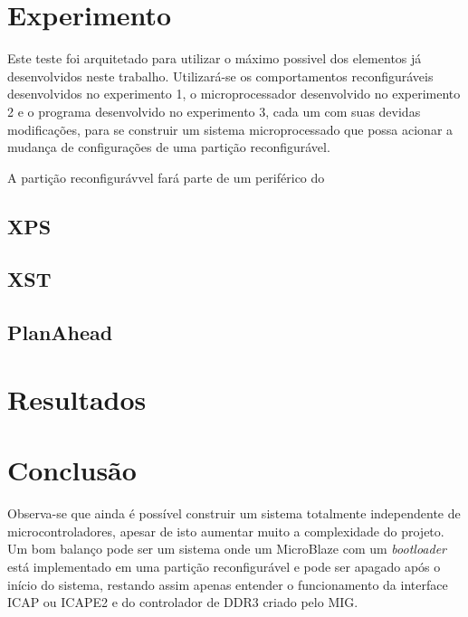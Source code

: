 \documentclass[11pt,a4paper,oneside]{book}
\begin{document}
\section{Experimento}
Este teste foi arquitetado para utilizar o máximo possivel dos elementos já desenvolvidos  neste trabalho.
Utilizará-se os comportamentos reconfiguráveis desenvolvidos no experimento 1, o microprocessador desenvolvido no experimento 2 e o programa desenvolvido no experimento 3, cada um com suas devidas modificações, para se construir um sistema microprocessado que possa acionar a mudança de configurações de uma partição reconfigurável.

A partição reconfigurávvel fará parte de um periférico do 

\subsection{XPS}

\subsection{XST}

\subsection{PlanAhead}

\section{Resultados}

\section{Conclusão}

Observa-se que ainda é possível construir um sistema totalmente independente de microcontroladores, apesar de isto aumentar muito a complexidade do projeto.
Um bom balanço pode ser um sistema onde um MicroBlaze com um \textit{bootloader} está implementado em uma partição reconfigurável e pode ser apagado após o início do sistema, restando assim apenas entender o funcionamento da interface ICAP ou ICAPE2 e do controlador de DDR3 criado pelo MIG.

\ifx\compilewholereport\undefined
	
	\newsavebox\mytempbib\savebox\mytempbib{\parbox{\textwidth}{}}

	\listoftodos
	
\end{document}
